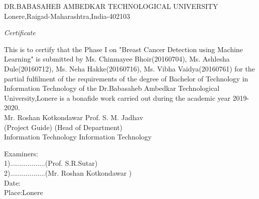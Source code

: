 \documentclass{report}
\begin{document}

\newpage
\clearpage\thispagestyle{empty}


\begin{center}

\large{DR.BABASAHEB AMBEDKAR TECHNOLOGICAL UNIVERSITY}\\
\normalsize
Lonere,Raigad-Maharashtra,India-402103\\
\vspace{0.5in}


\begin{figure}[h]
			\centerline{}
			\label{atcres}
		\end{figure}
\vspace{0.5in}
\emph{\LARGE Certificate}\\[1.5cm]
\end{center}
\normalsize This is to certify that the Phase I on "Breast Cancer Detection using Machine Learning" is submitted by Ms. Chinmayee Bhoir(20160704), Ms. Ashlesha Dule(20160712), Ms. Neha Hakke(20160716), Ms. Vibha Vaidya(20160761) for the partial fulfilment of the requirements of the degree of Bachelor of Technology in Information Technology of the Dr.Babasaheb Ambedkar Technological University,Lonere is a bonafide work carried out during the academic year 2019-2020.\\[1.0cm]


\vfill
\hspace{-0.2in}Mr. Roshan Kotkondawar\hspace{3.3in} Prof. S. M. Jadhav\\
(Project Guide)\hspace{3.85in} (Head of Department)\\
Information Technology\hspace{3.38in} Information Technology

\begin{flushleft}
Examiners:\\

1)..................(Prof. S.R.Sutar)\\


2)..................(Mr. Roshan Kotkondawar )\\[0.5cm]

Date:\\
Place:Lonere
\end{flushleft}
\end{document}
